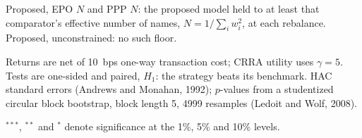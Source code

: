 \begin{table}[htbp]
\begin{threeparttable}
\begin{tablenotes}[flushleft]
\item Proposed, EPO $N$ and PPP $N$: the proposed model held to at least that comparator's effective number of names, $N=1/\sum_i w_i^2$, at each rebalance. Proposed, unconstrained: no such floor.
\item Returns are net of 10~bps one-way transaction cost; CRRA utility uses $\gamma=5$. Tests are one-sided and paired, $H_1$: the strategy beats its benchmark. HAC standard errors (Andrews and Monahan, 1992); $p$-values from a studentized circular block bootstrap, block length 5, 4999 resamples (Ledoit and Wolf, 2008).
\item $^{***}$, $^{**}$ and $^{*}$ denote significance at the 1\%, 5\% and 10\% levels.
\end{tablenotes}
\end{threeparttable}
\end{table}
